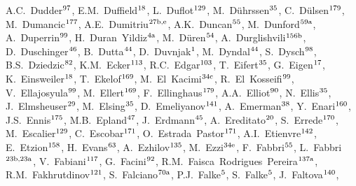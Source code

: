 \begin{flushleft}
A.C.~Dudder$^\textrm{\scriptsize 97}$,    
E.M.~Duffield$^\textrm{\scriptsize 18}$,    
L.~Duflot$^\textrm{\scriptsize 129}$,    
M.~D\"uhrssen$^\textrm{\scriptsize 35}$,    
C.~D{\"u}lsen$^\textrm{\scriptsize 179}$,    
M.~Dumancic$^\textrm{\scriptsize 177}$,    
A.E.~Dumitriu$^\textrm{\scriptsize 27b,e}$,    
A.K.~Duncan$^\textrm{\scriptsize 55}$,    
M.~Dunford$^\textrm{\scriptsize 59a}$,    
A.~Duperrin$^\textrm{\scriptsize 99}$,    
H.~Duran~Yildiz$^\textrm{\scriptsize 4a}$,    
M.~D\"uren$^\textrm{\scriptsize 54}$,    
A.~Durglishvili$^\textrm{\scriptsize 156b}$,    
D.~Duschinger$^\textrm{\scriptsize 46}$,    
B.~Dutta$^\textrm{\scriptsize 44}$,    
D.~Duvnjak$^\textrm{\scriptsize 1}$,    
M.~Dyndal$^\textrm{\scriptsize 44}$,    
S.~Dysch$^\textrm{\scriptsize 98}$,    
B.S.~Dziedzic$^\textrm{\scriptsize 82}$,    
K.M.~Ecker$^\textrm{\scriptsize 113}$,    
R.C.~Edgar$^\textrm{\scriptsize 103}$,    
T.~Eifert$^\textrm{\scriptsize 35}$,    
G.~Eigen$^\textrm{\scriptsize 17}$,    
K.~Einsweiler$^\textrm{\scriptsize 18}$,    
T.~Ekelof$^\textrm{\scriptsize 169}$,    
M.~El~Kacimi$^\textrm{\scriptsize 34c}$,    
R.~El~Kosseifi$^\textrm{\scriptsize 99}$,    
V.~Ellajosyula$^\textrm{\scriptsize 99}$,    
M.~Ellert$^\textrm{\scriptsize 169}$,    
F.~Ellinghaus$^\textrm{\scriptsize 179}$,    
A.A.~Elliot$^\textrm{\scriptsize 90}$,    
N.~Ellis$^\textrm{\scriptsize 35}$,    
J.~Elmsheuser$^\textrm{\scriptsize 29}$,    
M.~Elsing$^\textrm{\scriptsize 35}$,    
D.~Emeliyanov$^\textrm{\scriptsize 141}$,    
A.~Emerman$^\textrm{\scriptsize 38}$,    
Y.~Enari$^\textrm{\scriptsize 160}$,    
J.S.~Ennis$^\textrm{\scriptsize 175}$,    
M.B.~Epland$^\textrm{\scriptsize 47}$,    
J.~Erdmann$^\textrm{\scriptsize 45}$,    
A.~Ereditato$^\textrm{\scriptsize 20}$,    
S.~Errede$^\textrm{\scriptsize 170}$,    
M.~Escalier$^\textrm{\scriptsize 129}$,    
C.~Escobar$^\textrm{\scriptsize 171}$,    
O.~Estrada~Pastor$^\textrm{\scriptsize 171}$,    
A.I.~Etienvre$^\textrm{\scriptsize 142}$,    
E.~Etzion$^\textrm{\scriptsize 158}$,    
H.~Evans$^\textrm{\scriptsize 63}$,    
A.~Ezhilov$^\textrm{\scriptsize 135}$,    
M.~Ezzi$^\textrm{\scriptsize 34e}$,    
F.~Fabbri$^\textrm{\scriptsize 55}$,    
L.~Fabbri$^\textrm{\scriptsize 23b,23a}$,    
V.~Fabiani$^\textrm{\scriptsize 117}$,    
G.~Facini$^\textrm{\scriptsize 92}$,    
R.M.~Faisca~Rodrigues~Pereira$^\textrm{\scriptsize 137a}$,    
R.M.~Fakhrutdinov$^\textrm{\scriptsize 121}$,    
S.~Falciano$^\textrm{\scriptsize 70a}$,    
P.J.~Falke$^\textrm{\scriptsize 5}$,    
S.~Falke$^\textrm{\scriptsize 5}$,    
J.~Faltova$^\textrm{\scriptsize 140}$,    

\end{flushleft}
